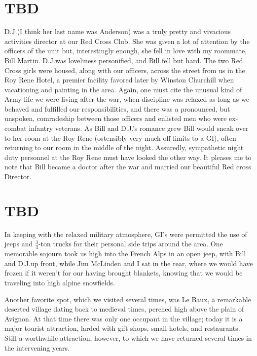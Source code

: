 \documentclass[../m3y]{subfiles}
\begin{document}
\section{TBD}
D.J.\@ (I think her last name was Anderson) was a truly pretty and vivacious activities director at our Red Cross Club. She was given a lot of attention by the officers of the unit but, interestingly enough, she fell in love with my roommate, Bill Martin. D.J.\@ was loveliness personified, and Bill fell but hard. The two Red Cross girls were housed, along with our officers, across the street from us in the Roy Rene Hotel, a premier facility favored later by Winston Churchill when vacationing and painting in the area. Again, one must cite the unusual kind of Army life we were living after the war, when discipline was relaxed as long as we behaved and fulfilled our responsibilities, and there was a pronounced, but unspoken, comradeship between those officers and enlisted men who were ex-combat infantry veterans. As Bill and D.J.'s romance grew Bill would sneak over to her room at the Roy Rene (ostensibly very much off-limits to a GI), often returning to our room in the middle of the night. Assuredly, sympathetic night duty personnel at the Roy Rene must have looked the other way. It pleases me to note that Bill became a doctor after the war and married our beautiful Red cross Director.

\section{TBD}
In keeping with the relaxed military atmosphere, GI's were permitted the use of jeeps and \( \frac{3}{4} \)-ton trucks for their personal side trips around the area. One memorable sojourn took us high into the French Alps in an open jeep, with Bill and D.J.\@ up front, while Jim McLinden and I sat in the rear, where we would have frozen if it weren't for our having brought blankets, knowing that we would be traveling into high alpine snowfields.

Another favorite spot, which we visited several times, was Le Baux, a remarkable deserted village dating back to medieval times, perched high above the plain of Avignon.  At that time there was only one occupant in the village; today it is a major tourist attraction, larded with gift shops, small hotels, and restaurants. Still a worthwhile attraction, however, to which we have returned several times in the intervening years.
\end{document}
